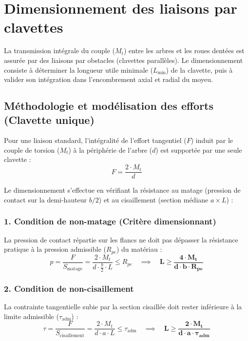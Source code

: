 \documentclass[11pt,a4paper]{article}
\begin{document}
\section{Dimensionnement des liaisons par clavettes}

La transmission intégrale du couple ($M_t$) entre les arbres et les roues dentées est assurée par des liaisons par obstacles (clavettes parallèles). Le dimensionnement consiste à déterminer la longueur utile minimale ($L_{\min}$) de la clavette, puis à valider son intégration dans l'encombrement axial et radial du moyeu.

\subsection{Méthodologie et modélisation des efforts (Clavette unique)}

Pour une liaison standard, l'intégralité de l'effort tangentiel ($F$) induit par le couple de torsion ($M_t$) à la périphérie de l'arbre ($d$) est supportée par une seule clavette :
\[ F = \frac{2 \cdot M_t}{d} \]

Le dimensionnement s'effectue en vérifiant la résistance au matage (pression de contact sur la demi-hauteur $b/2$) et au cisaillement (section médiane $a \times L$) :

\subsubsection*{1. Condition de non-matage (Critère dimensionnant)}
La pression de contact répartie sur les flancs ne doit pas dépasser la résistance pratique à la pression admissible ($R_{pe}$) du matériau :
\[ p = \frac{F}{S_{\text{matage}}} = \frac{2 \cdot M_t}{d \cdot \frac{b}{2} \cdot L} \le R_{pe} \quad \implies \quad \mathbf{L \ge \frac{4 \cdot M_t}{d \cdot b \cdot R_{pe}}} \]

\subsubsection*{2. Condition de non-cisaillement}
La contrainte tangentielle subie par la section cisaillée doit rester inférieure à la limite admissible ($\tau_{\text{adm}}$) :
\[ \tau = \frac{F}{S_{\text{cisaillement}}} = \frac{2 \cdot M_t}{d \cdot a \cdot L} \le \tau_{\text{adm}} \quad \implies \quad \mathbf{L \ge \frac{2 \cdot M_t}{d \cdot a \cdot \tau_{\text{adm}}}} \]
\end{document}

